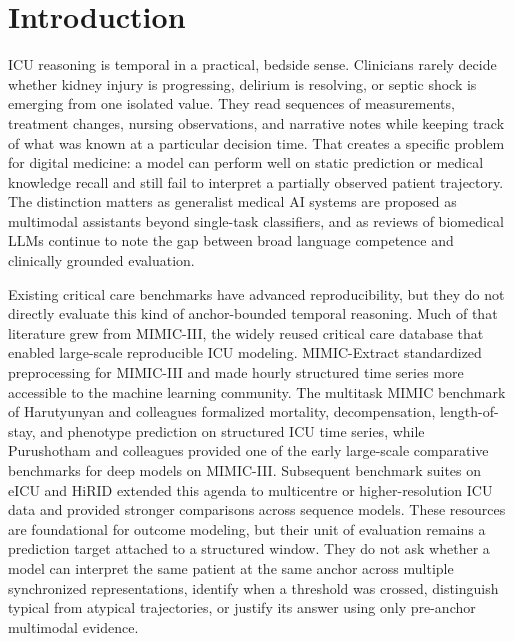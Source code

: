 \documentclass[pdflatex,sn-nature]{sn-jnl}
\begin{document}
\section{Introduction}

ICU reasoning is temporal in a practical, bedside sense. Clinicians rarely decide whether kidney injury is progressing, delirium is resolving, or septic shock is emerging from one isolated value. They read sequences of measurements, treatment changes, nursing observations, and narrative notes while keeping track of what was known at a particular decision time. That creates a specific problem for digital medicine: a model can perform well on static prediction or medical knowledge recall and still fail to interpret a partially observed patient trajectory. The distinction matters as generalist medical AI systems are proposed as multimodal assistants beyond single-task classifiers\cite{moor2023gmai}, and as reviews of biomedical LLMs continue to note the gap between broad language competence and clinically grounded evaluation\cite{lu2024biomedllm,bedi2025systematic}.

Existing critical care benchmarks have advanced reproducibility, but they do not directly evaluate this kind of anchor-bounded temporal reasoning. Much of that literature grew from MIMIC-III, the widely reused critical care database that enabled large-scale reproducible ICU modeling\cite{johnson2016mimiciii}. MIMIC-Extract standardized preprocessing for MIMIC-III and made hourly structured time series more accessible to the machine learning community\cite{wang2020mimicextract}. The multitask MIMIC benchmark of Harutyunyan and colleagues formalized mortality, decompensation, length-of-stay, and phenotype prediction on structured ICU time series\cite{harutyunyan2019multitask}, while Purushotham and colleagues provided one of the early large-scale comparative benchmarks for deep models on MIMIC-III\cite{purushotham2018benchmarking}. Subsequent benchmark suites on eICU and HiRID extended this agenda to multicentre or higher-resolution ICU data and provided stronger comparisons across sequence models\cite{sheikhalishahi2020eicu,yeche2021hirid}. These resources are foundational for outcome modeling, but their unit of evaluation remains a prediction target attached to a structured window. They do not ask whether a model can interpret the same patient at the same anchor across multiple synchronized representations, identify when a threshold was crossed, distinguish typical from atypical trajectories, or justify its answer using only pre-anchor multimodal evidence.
\end{document}
